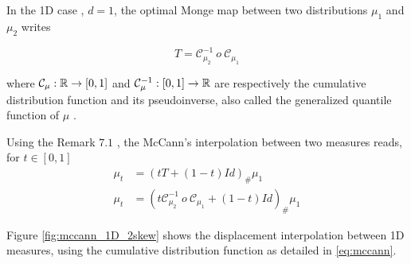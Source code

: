 In the 1D case \cite[see][Remark 2.30]{peyre_computational_2020}, $d=1$, the optimal Monge map between two distributions $\mu_1$ and $\mu_2$ writes 

\begin{equation}\label{eq:monge_map}
    T=\mathcal{C}^{-1}_{\mu_2}\ o\ \mathcal{C}_{\mu_1} 
\end{equation}

where $\mathcal{C}_{\mu} : \mathbb{R} \rightarrow [0, 1]$ and $\mathcal{C}^{-1}_\mu : [0, 1]\rightarrow \mathbb{R} $ are respectively the cumulative distribution function and its pseudoinverse, also called the generalized quantile function of $\mu$ .

Using the Remark $7.1$ \cite{peyre_computational_2020}, the McCann's interpolation \cite{mccann_convexity_1997} between two measures reads, for $t\in [0, 1]$ 
\begin{align}
    \mu_t &= (tT + (1-t)Id)_\#\mu_1 \nonumber \\
    \mu_t &= (t\mathcal{C}^{-1}_{\mu_2}\ o\ \mathcal{C}_{\mu_1} + (1-t)Id)_\#\mu_1 \label{eq:mccann}
\end{align}

Figure \ref{fig:mccann_1D_2skew} shows the displacement interpolation between 1D measures, using the cumulative distribution function as detailed in \eqref{eq:mccann}.

